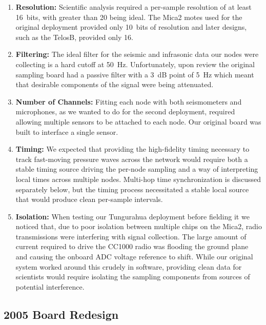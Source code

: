 \begin{enumerate}
\item {\bf Resolution:} Scientific analysis required a per-sample resolution
of at least 16~bits, with greater than 20 being ideal. The Mica2 motes used
for the original deployment provided only 10~bits of resolution and later
designs, such as the TelosB, provided only 16.
\item {\bf Filtering:} The ideal filter for the seismic and infrasonic data
our nodes were collecting is a hard cutoff at 50~Hz. Unfortunately, upon
review the original sampling board had a passive filter with a 3~dB point of
5~Hz which meant that desirable components of the signal were being
attenuated.
\item {\bf Number of Channels:} Fitting each node with both seismometers and
microphones, as we wanted to do for the second deployment, required allowing
multiple sensors to be attached to each node. Our original board was built to
interface a single sensor.
\item {\bf Timing:} We expected that providing the high-fidelity timing
necessary to track fast-moving pressure waves across the network would
require both a stable timing source driving the per-node sampling and a way
of interpreting local times across multiple nodes.  Multi-hop time
synchronization is discussed separately below, but the timing process
necessitated a stable local source that would produce clean per-sample
intervals.
\item {\bf Isolation:} When testing our Tungurahua deployment before fielding
it we noticed that, due to poor isolation between multiple chips on the
Mica2, radio transmissions were interfering with signal collection. The large
amount of current required to drive the CC1000 radio was flooding the ground
plane and causing the onboard ADC voltage reference to shift. While our
original system worked around this crudely in software, providing clean data
for scientists would require isolating the sampling components from sources
of potential interference.
\end{enumerate}

\subsection{2005 Board Redesign}
\label{sec-2005-board}

